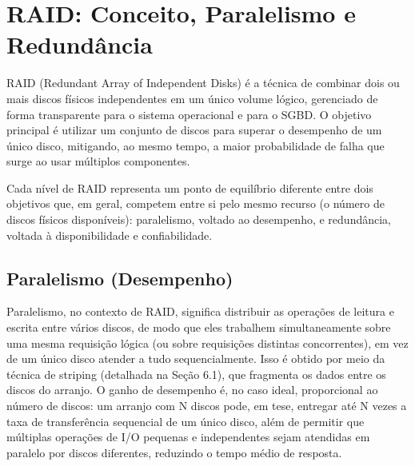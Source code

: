 \documentclass[11pt,a4paper]{article}
\begin{document}
\section{RAID: Conceito, Paralelismo e Redundância}
RAID (Redundant Array of Independent Disks) é a técnica de combinar dois ou mais discos físicos independentes em um único volume lógico, gerenciado de forma transparente para o sistema operacional e para o SGBD. O objetivo principal é utilizar um conjunto de discos para superar o desempenho de um único disco, mitigando, ao mesmo tempo, a maior probabilidade de falha que surge ao usar múltiplos componentes.

Cada nível de RAID representa um ponto de equilíbrio diferente entre dois objetivos que, em geral, competem entre si pelo mesmo recurso (o número de discos físicos disponíveis): paralelismo, voltado ao desempenho, e redundância, voltada à disponibilidade e confiabilidade.

\subsection{Paralelismo (Desempenho)}
Paralelismo, no contexto de RAID, significa distribuir as operações de leitura e escrita entre vários discos, de modo que eles trabalhem simultaneamente sobre uma mesma requisição lógica (ou sobre requisições distintas concorrentes), em vez de um único disco atender a tudo sequencialmente. Isso é obtido por meio da técnica de striping (detalhada na Seção 6.1), que fragmenta os dados entre os discos do arranjo. O ganho de desempenho é, no caso ideal, proporcional ao número de discos: um arranjo com N discos pode, em tese, entregar até N vezes a taxa de transferência sequencial de um único disco, além de permitir que múltiplas operações de I/O pequenas e independentes sejam atendidas em paralelo por discos diferentes, reduzindo o tempo médio de resposta.
\end{document}
